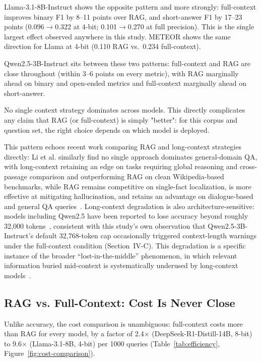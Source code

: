 \documentclass[conference]{IEEEtran}
\begin{document}
Llama-3.1-8B-Instruct shows the opposite pattern and more strongly: full-context improves binary F1 by 8--11 points over RAG, and short-answer F1 by 17--23 points (0.096$\to$0.322 at 4-bit; 0.101$\to$0.270 at full precision). This is the single largest effect observed anywhere in this study.
METEOR shows the same direction for Llama at 4-bit (0.110 RAG vs.\ 0.234 full-context).

Qwen2.5-3B-Instruct sits between these two patterns: full-context and RAG are close throughout (within 3--6 points on every metric), with RAG marginally ahead on binary and open-ended metrics and full-context marginally ahead on short-answer.

No single context strategy dominates across models.
This directly complicates any claim that RAG (or full-context) is simply "better": for this corpus and question set, the right choice depends on which model is deployed.

This pattern echoes recent work comparing RAG and long-context strategies directly: Li et al. similarly find no single approach dominates general-domain \gls{QA}, with long-context retaining an edge on tasks requiring global reasoning and cross-passage comparison and outperforming RAG on clean Wikipedia-based benchmarks, while RAG remains competitive on single-fact localization, is more effective at mitigating hallucination, and retains an advantage on dialogue-based and general \gls{QA} queries~\cite{li2024longcontext}.
Long-context degradation is also architecture-sensitive: models including Qwen2.5 have been reported to lose accuracy beyond roughly 32{,}000 tokens~\cite{li2024longcontext}, consistent with this study's own observation that Qwen2.5-3B-Instruct's default 32{,}768-token cap occasionally triggered context-length warnings under the full-context condition (Section~IV-C).
This degradation is a specific instance of the broader ``lost-in-the-middle'' phenomenon, in which relevant information buried mid-context is systematically underused by long-context models~\cite{liu2024lostinthemiddle}.

\subsection{RAG vs. Full-Context: Cost Is Never Close}

Unlike accuracy, the cost comparison is unambiguous: full-context costs more than RAG for every model, by a factor of 2.4$\times$ (DeepSeek-R1-Distill-14B, 8-bit) to 9.6$\times$ (Llama-3.1-8B, 4-bit) per 1000 queries (Table~\ref{tab:efficiency}, Figure~\ref{fig:cost-comparison}).
\end{document}
